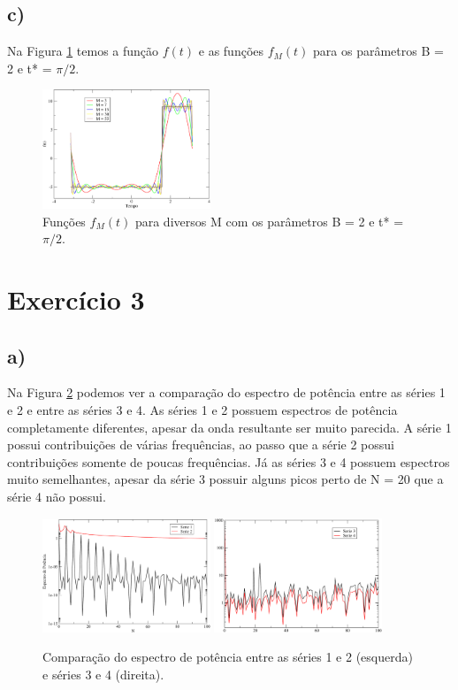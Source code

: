 \documentclass[a4wide]{report}
\begin{document}
\subsection*{c)}

Na Figura \ref{c} temos a função $f(t)$ e as funções $f_{M}(t)$ para os parâmetros B = 2 e t* = $\pi / 2$.

\begin{figure}[!htb]
\centering
\includegraphics[width=0.447\textwidth]{c.pdf}
\caption{ Funções $f_{M}(t)$  para diversos M com os parâmetros B = 2 e t* = $\pi / 2$.}
\label{c}
\end{figure}


\section*{Exercício 3}
\subsection*{a)}

Na Figura \ref{pot} podemos ver a comparação do espectro de potência entre as séries 1 e 2 e entre as séries 3 e 4. As séries 1 e 2 possuem espectros de potência completamente diferentes, apesar da onda resultante ser muito parecida. A série 1 possui contribuições de várias frequências, ao passo que a série 2 possui contribuições somente de poucas frequências. Já as séries 3 e 4 possuem espectros muito semelhantes, apesar da série 3 possuir alguns picos perto de N = 20 que a série 4 não possui.


\begin{figure}[!htb]
\centering
\includegraphics[width=0.447\textwidth]{saida2.pdf}
\includegraphics[width=0.447\textwidth]{saida4.pdf}
\caption{ Comparação do espectro de potência entre as séries 1 e 2 (esquerda) e séries 3 e 4 (direita).}
\label{pot}
\end{figure}
\end{document}
